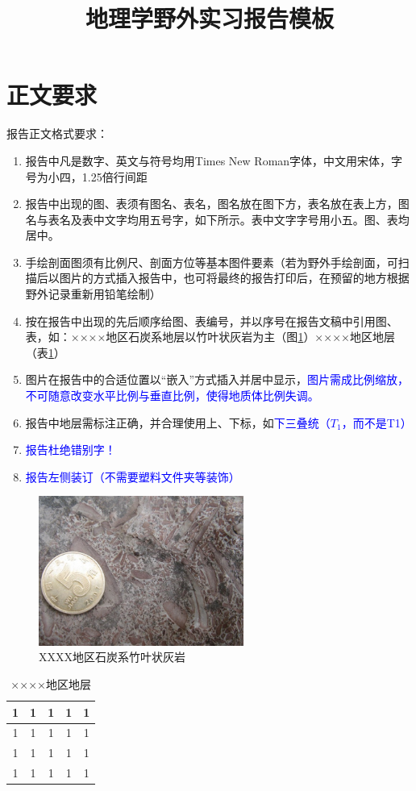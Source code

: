\documentclass{fieldpractice-geo}
\title{地理学野外实习报告模板}
\begin{document}
	\maketitle
\section{正文要求}
报告正文格式要求：
\begin{enumerate}
	\item 报告中凡是数字、英文与符号均用Times New Roman字体，中文用宋体，字号为小四，1.25倍行间距
	\item 报告中出现的图、表须有图名、表名，图名放在图下方，表名放在表上方，图名与表名及表中文字均用五号字，如下所示。表中文字字号用小五。图、表均居中。
	\item 手绘剖面图须有比例尺、剖面方位等基本图件要素（若为野外手绘剖面，可扫描后以图片的方式插入报告中，也可将最终的报告打印后，在预留的地方根据野外记录重新用铅笔绘制）
	\item 按在报告中出现的先后顺序给图、表编号，并以序号在报告文稿中引用图、表，如：××××地区石炭系地层以竹叶状灰岩为主（图\ref{fig:XXXX地区石炭系竹叶状灰岩}）××××地区地层（表\ref{tab:××××地区地层}）
	\item 图片在报告中的合适位置以“嵌入”方式插入并居中显示，\textcolor{blue}{图片需成比例缩放，不可随意改变水平比例与垂直比例，使得地质体比例失调。}
	\item 报告中地层需标注正确，并合理使用上、下标，如\textcolor{blue}{下三叠统（$T_1$，而不是T1）}
	\item \textcolor{blue}{报告杜绝错别字！}
	\item \textcolor{blue}{报告左侧装订（不需要塑料文件夹等装饰）}
\end{enumerate}
\begin{figure}[ht]
	\centering
	\includegraphics[width=0.6\textwidth]{figures/XXXX地区石炭系竹叶状灰岩.jpg}
	\caption{XXXX地区石炭系竹叶状灰岩}
	\label{fig:XXXX地区石炭系竹叶状灰岩}
\end{figure}
\begin{table}[htbp]
	\centering
	\caption{××××地区地层}
	\begin{tabular}{ccccc}
		\toprule
		1 &  1     & 1      &  1     & 1 \\
		\midrule
		1 & 1      & 1      &  1     & 1 \\
		1 & 1      & 1      &  1     & 1 \\
		1 & 1      & 1      &  1     & 1 \\
		\bottomrule
	\end{tabular}%
	\label{tab:××××地区地层}%
\end{table}%
\end{document}
